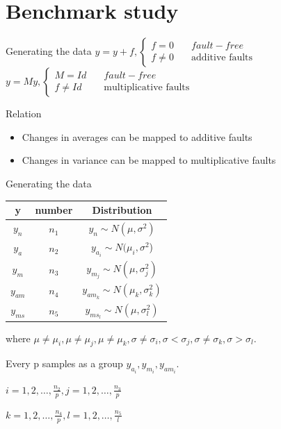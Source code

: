 \documentclass[10pt]{beamer}
\begin{document}
\section{Benchmark study}
\begin{frame}{Generating the data}
    $y = y + f, \left\{ \begin{aligned}
    f = 0      \quad &fault-free \\
    f \neq 0   \quad &\text{additive faults}
     \end{aligned} 
     \right. $
   $y = My,\left\{ \begin{aligned}
    M = Id     \quad &fault-free \\
    f \neq Id   \quad &\text{multiplicative faults}
     \end{aligned} 
     \right. $
      \begin{exampleblock}{Relation}
	\begin{itemize}
    \item Changes in averages can be mapped to additive faults
    \item Changes in variance can be mapped to multiplicative faults
    \end{itemize}
    \end{exampleblock}
\end{frame}
\begin{frame}{Generating the data}
\begin{center}
\begin{tabular}{ccc}
\hline
y& number& Distribution                                    \\
\hline
$y_n  $ &$n_1$& $y_n \sim N(\mu, \sigma^2)$                \\
$y_a  $ &$n_2$& $y_{a_i} \sim N(\mu_i,\sigma^2$)           \\
$y_m  $ &$n_3$& $y_{m_j} \sim N(\mu,\sigma_j^2)$           \\
$y_{am}$&$n_4$& $y_{am_k}\sim N(\mu_k,\sigma_k^2)$         \\
$y_{ms}$ &$n_5$& $y_{ms_l} \sim N(\mu,\sigma_l^2)$  \\
\hline
\end{tabular}
\end{center}
where $\mu \neq \mu_i,\mu \neq \mu_j,\mu \neq \mu_k,\sigma \neq \sigma_i,\sigma < \sigma_j,\sigma \neq \sigma_k,\sigma > \sigma_l$. \par Every p samples as a group
$y_{a_i},y_{m_i},y_{am_i}$. \par $i = 1,2,\dots,\frac{n_2}{p},j=1,2,\dots,\frac{n_3}{p}$ \par
$k = 1,2,\dots,\frac{n_4}{p},l = 1,2,\dots, \frac{n_5}{l}$
\end{frame}
\end{document}
